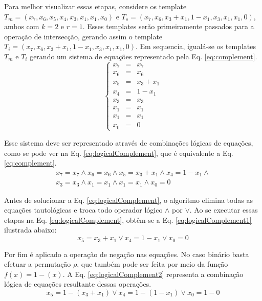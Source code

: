 Para melhor visualizar essas etapas, considere os template $T_m = (x_7, x_6, x_5, x_4, x_3, x_1, x_1, x_0)$ e $T_s = (x_7, x_6, x_3 + x_1, 1 - x_1, x_3, x_1, x_1, 0)$, ambos com $k=2$ e $r=1$. Esses templates serão primeiramente passados para a operação de intersecção, gerando assim o template $T_i = (x_7, x_6, x_3 + x_1, 1 - x_1, x_3, x_1, x_1, 0)$. Em sequencia, igualá-se os templates $T_m$ e $T_i$ gerando um sistema de equações representado pela Eq. \eqref{eq:complement}.
\begin{equation}
\left\{\begin{matrix}
x_7 & = & x_7	\\ 
x_6 & = & x_6	\\ 
x_5 & = & x_3 + x_1	\\ 
x_4 & = & 1 - x_1 \\ 
x_3 & = & x_3	\\ 
x_1 & = & x_1	\\ 
x_1 & = & x_1	\\ 
x_0 & = & 0
\end{matrix}\right.
\label{eq:complement}
\end{equation}

Esse sistema deve ser representado através de combinações lógicas de equações, como se pode ver na Eq. \eqref{eq:logicalComplement}, que é equivalente a Eq. \eqref{eq:complement}.
\begin{equation}
\begin{split}
x_7 = x_7	\wedge  
x_6 = x_6	\wedge  
x_5 = x_3 + x_1	\wedge  
x_4 =   1 - x_1 \wedge  \\
x_3 = x_3	\wedge  
x_1 = x_1	\wedge  
x_1 = x_1	\wedge  
x_0 = 0
\end{split}
\label{eq:logicalComplement}
\end{equation}

Antes de solucionar a Eq. \eqref{eq:logicalComplement}, o algoritmo elimina todas as equações tautológicas e troca todo operador lógico $\wedge$ por $\vee$. Ao se executar essas etapas na Eq. \eqref{eq:logicalComplement}, obtêm-se a Eq. \eqref{eq:logicalComplement1} ilustrada abaixo:
\begin{equation}
x_5 = x_3 + x_1 \vee x_4 = 1 - x_1 \vee x_0 = 0
\label{eq:logicalComplement1}
\end{equation}

Por fim é aplicado a operação de negação nas equações. No caso binário basta efetuar a permutação $\rho$, que também pode ser feita por meio da função $f(x) = 1 - (x)$. A Eq. \eqref{eq:logicalComplement2} representa a combinação lógica de equações resultante dessas operações.
\begin{equation}
x_5 = 1 - (x_3 + x_1) \vee x_4 = 1 - (1 - x_1) \vee x_0 = 1 - 0
\label{eq:logicalComplement2}
\end{equation}

